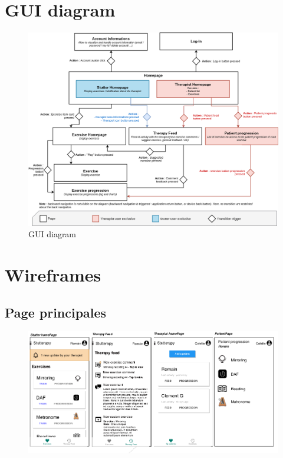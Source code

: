 \begin{appendices}
\chapter{GUI diagram}
\label{appendix:ihm}
\begin{figure}[H]
  \includegraphics[width=1\linewidth]{content/imgs/IHM_diagram.png}
  \caption*{GUI diagram}
\end{figure}


\chapter{Wireframes}
\label{appendix:wireframes}
\section{Page principales}
\begin{figure}[H]
  \includegraphics[width=1\linewidth]{content/imgs/maquette1.png}
\end{figure}


\end{appendices}
